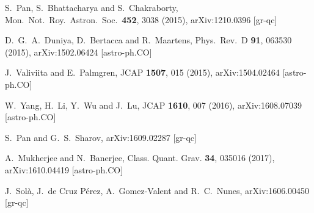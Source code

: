 \documentclass[superscriptaddress,oneolumn,secnumarabic,
amssymb,amsmath,nobibnotes,aps,prd,showpacs,nofootinbib]{revtex4}%
\begin{document}
\begin{thebibliography}{*}
S.~Pan, S.~Bhattacharya and S.~Chakraborty,
Mon.\ Not.\ Roy.\ Astron.\ Soc.\  {\bf 452}, 3038 (2015),
arXiv:1210.0396 [gr-qc]



  D.~G.~A.~Duniya, D.~Bertacca and R.~Maartens,
  Phys.\ Rev.\ D {\bf 91}, 063530 (2015),
  arXiv:1502.06424 [astro-ph.CO]



  J.~Valiviita and E.~Palmgren,
  JCAP {\bf 1507}, 015 (2015),
  arXiv:1504.02464 [astro-ph.CO]




W.~Yang, H.~Li, Y.~Wu and J.~Lu,
JCAP {\bf 1610}, 007 (2016),
arXiv:1608.07039 [astro-ph.CO]




S.~Pan and G.~S.~Sharov,
arXiv:1609.02287 [gr-qc]




A.~Mukherjee and N.~Banerjee, Class. Quant. Grav. \textbf{34}, 035016 (2017),
arXiv:1610.04419 [astro-ph.CO]



J.~Sol\`{a}, J.~de Cruz P\'erez, A.~Gomez-Valent and R.~C.~Nunes,
arXiv:1606.00450 [gr-qc]



\end{thebibliography}
\end{document}
